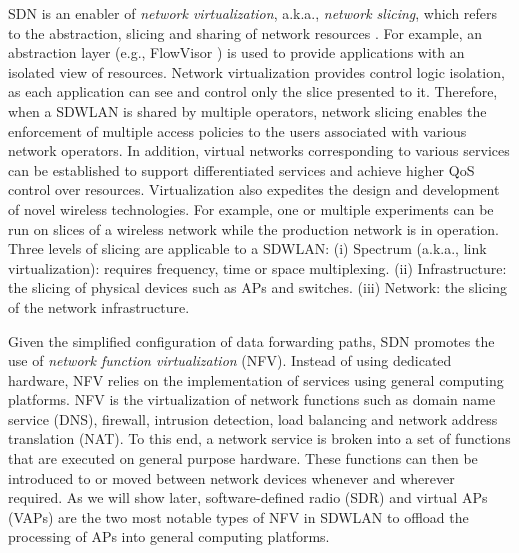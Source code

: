 {%
SDN is an enabler of \textit{network virtualization}, a.k.a., \textit{network slicing}, which refers to the abstraction, slicing and sharing of network resources \cite{wang2013network}. 
For example, an abstraction layer (e.g., FlowVisor \cite{sherwood2009flowvisor}) is used to provide applications with an isolated view of resources.
Network virtualization provides control logic isolation, as each application can see and control only the slice presented to it.
Therefore, when a SDWLAN is shared by multiple operators, network slicing enables the enforcement of multiple access policies to the users associated with various network operators.
In addition, virtual networks corresponding to various services can be established to support differentiated services and achieve higher QoS control over resources.
Virtualization also expedites the design and development of novel wireless technologies.
For example, one or multiple experiments can be run on slices of a wireless network while the production network is in operation.
Three levels of slicing are applicable to a SDWLAN: 
(i) Spectrum (a.k.a., link virtualization): requires frequency, time or space multiplexing. 
(ii) Infrastructure: the slicing of physical devices such as APs and switches. 
(iii) Network: the slicing of the network infrastructure.


Given the simplified configuration of data forwarding paths, SDN promotes the use of \textit{network function virtualization} (NFV). 
Instead of using dedicated hardware, NFV relies on the implementation of services using general computing platforms.
NFV is the virtualization of network functions such as domain name service (DNS), firewall, intrusion detection, load balancing and network address translation (NAT).
To this end, a network service is broken into a set of functions that are executed on general purpose hardware.
These functions can then be introduced to or moved between network devices whenever and wherever required.
As we will show later, software-defined radio (SDR) and virtual APs (VAPs) are the two most notable types of NFV in SDWLAN to offload the processing of APs into general computing platforms.

}






